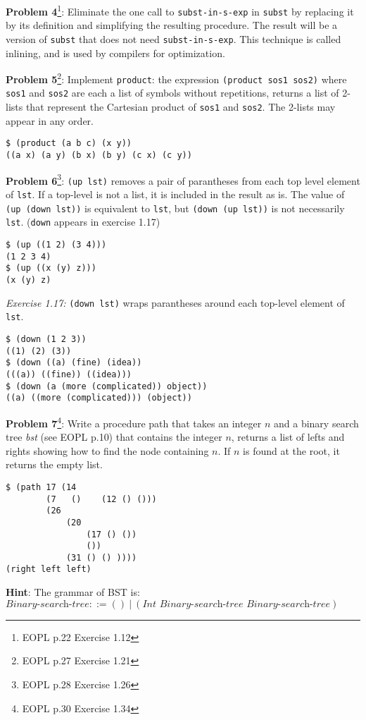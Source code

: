 \documentclass[12pt,reqno]{amsart}
\newcommand{\code}[1]{\texttt{#1}}
\begin{document}
\vspace{7.5mm}

\textbf{Problem 4}\footnote{EOPL p.22 Exercise 1.12}: Eliminate the one call to \code{subst-in-s-exp} in \code{subst} by replacing it by its definition and simplifying the resulting procedure. The result will be a version of \code{subst} that does not need \code{subst-in-s-exp}. This technique is called inlining, and is used by compilers for optimization.

\vspace{7.5mm}

\textbf{Problem 5}\footnote{EOPL p.27 Exercise 1.21}: Implement \code{product}: the expression \code{(product sos1 sos2)} where \code{sos1} and \code{sos2} are each a list of symbols without repetitions, returns a list of 2-lists that represent the Cartesian product of \code{sos1} and \code{sos2}. The 2-lists may appear in any order.
\begin{lstlisting}
$ (product (a b c) (x y))
((a x) (a y) (b x) (b y) (c x) (c y))
\end{lstlisting}

\vspace{7.5mm}

\textbf{Problem 6}\footnote{EOPL p.28 Exercise 1.26}: \code{(up lst)} removes a pair of parantheses from each top level element of \code{lst}. If a top-level is not a list, it is included in the result as is. The value of \code{(up (down lst))} is equivalent to \code{lst}, but \code{(down (up lst))} is not necessarily \code{lst}. (\code{down} appears in exercise 1.17)
\begin{lstlisting}
$ (up ((1 2) (3 4)))
(1 2 3 4)
$ (up ((x (y) z)))
(x (y) z)
\end{lstlisting}
\textit{Exercise 1.17:}
\code{(down lst)} wraps parantheses around each top-level element of \code{lst}.
\begin{lstlisting}
$ (down (1 2 3))
((1) (2) (3))
$ (down ((a) (fine) (idea))
(((a)) ((fine)) ((idea)))
$ (down (a (more (complicated)) object))
((a) ((more (complicated))) (object))
\end{lstlisting}

\newpage
\textbf{Problem 7}\footnote{EOPL p.30 Exercise 1.34}: Write a procedure path that takes an integer $n$ and a binary search tree \textit{bst} (see EOPL p.10) that contains the integer $n$, returns a list of lefts and rights showing how to find the node containing $n$. If $n$ is found at the root, it returns the empty list.
\begin{lstlisting}
$ (path 17 (14 
	    (7   ()    (12 () ()))
	    (26 
	        (20 
	            (17 () ())
	            ())
	        (31 () () ))))
(right left left)
\end{lstlisting}
\textbf{Hint}: The grammar of BST is: \\ $\textit{Binary-search-tree} ::= () \  | \  (\textit{Int Binary-search-tree Binary-search-tree})$
\end{document}
